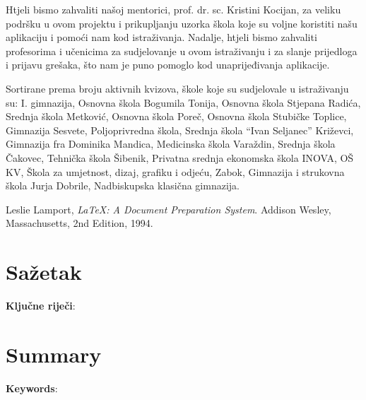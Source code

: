 \documentclass{scrreprt}
\begin{document}
Htjeli bismo zahvaliti našoj mentorici, prof. dr. sc. Kristini Kocijan, za
veliku podršku u ovom projektu i prikupljanju uzorka škola koje su voljne
koristiti našu aplikaciju i pomoći nam kod istraživanja. Nadalje, htjeli bismo
zahvaliti profesorima i učenicima za sudjelovanje u ovom istraživanju i za
slanje prijedloga i prijavu grešaka, što nam je puno pomoglo kod unaprijeđivanja
aplikacije.

Sortirane prema broju aktivnih kvizova, škole koje su sudjelovale u istraživanju
su: I. gimnazija, Osnovna škola Bogumila Tonija, Osnovna škola Stjepana Radića,
Srednja škola Metković, Osnovna škola Poreč, Osnovna škola Stubičke Toplice,
Gimnazija Sesvete, Poljoprivredna škola, Srednja škola ``Ivan Seljanec''
Križevci, Gimnazija fra Dominika Mandica, Medicinska škola Varaždin, Srednja
škola Čakovec, Tehnička škola Šibenik, Privatna srednja ekonomska škola INOVA,
OŠ KV, Škola za umjetnost, dizaj, grafiku i odjeću, Zabok, Gimnazija i strukovna
škola Jurja Dobrile, Nadbiskupska klasična gimnazija.

\listoffigures

\renewcommand{\bibname}{Popis literature}

\begin{thebibliography}{9}
   Leslie Lamport, \emph{\LaTeX: A Document Preparation
    System}. Addison Wesley, Massachusetts, 2nd Edition, 1994.
\end{thebibliography}

\chapter{Sažetak}

\textbf{Ključne riječi}:

\chapter{Summary}

\textbf{Keywords}:
\end{document}
